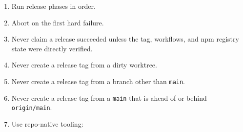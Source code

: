 \begin{enumerate}
\def\labelenumi{\arabic{enumi}.}
\tightlist
\item
  Run release phases in order.
\item
  Abort on the first hard failure.
\item
  Never claim a release succeeded unless the tag, workflows, and npm registry state were directly verified.
\item
  Never create a release tag from a dirty worktree.
\item
  Never create a release tag from a branch other than \texttt{m\allowbreak{}a\allowbreak{}i\allowbreak{}n}.
\item
  Never create a release tag from a \texttt{m\allowbreak{}a\allowbreak{}i\allowbreak{}n} that is ahead of or behind \texttt{o\allowbreak{}r\allowbreak{}i\allowbreak{}g\allowbreak{}i\allowbreak{}n\allowbreak{}/\allowbreak{}m\allowbreak{}a\allowbreak{}i\allowbreak{}n}.
\item
  Use repo-native tooling:


\end{enumerate}
